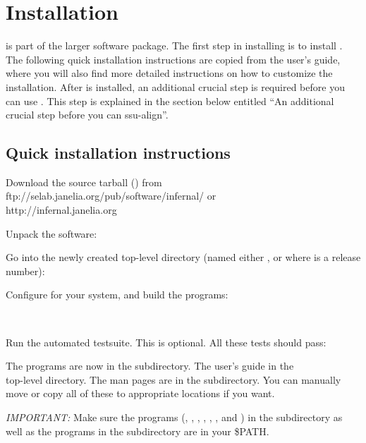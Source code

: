 \section{Installation}

 is part of the larger  software
package. The first step in installing  is to install
. The following quick installation instructions are
copied from the  user's guide, where you will also find
more detailed instructions on how to customize the installation. 
After  is installed, an additional crucial step is
required before you can use . This step is explained
in the section below entitled ``An additional crucial step before you
can ssu-align''.

\subsection{Quick installation instructions}


Download the source tarball () from 
                  {ftp://selab.janelia.org/pub/software/infernal/}
or \\
                  {http://infernal.janelia.org}

Unpack the software:


Go into the newly created top-level directory (named either
, or  where  is a release
number):


Configure for your system, and build the programs:

\\

Run the automated testsuite. This is optional. All these tests should
pass:


The programs are now in the  subdirectory. The
 user's guide in the \\ 
top-level  directory. The man pages are in the
subdirectory. You can manually move or copy all of these to
appropriate locations if you want. 

\emph{IMPORTANT:}
Make sure the  programs (, 
, , , ,
, and ) in the  subdirectory
as well as the  programs in the 
subdirectory are in your \$PATH.

